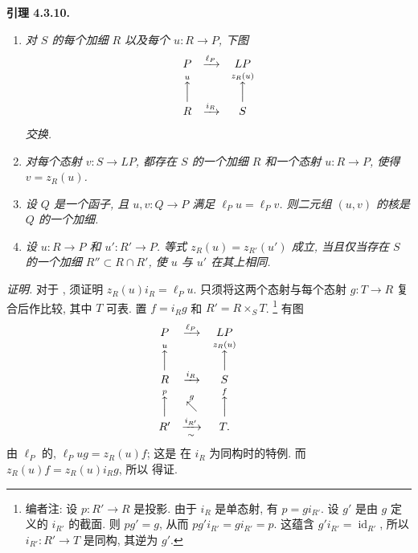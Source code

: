 \medskip
\noindent{}\textbf{引理 4.3.10.}
\begin{enumerate}
 \item[(i)] \textit{对 \(S\) 的每个加细
 \(R\) 以及每个 \(u:R\to P\), 下图}
 \[
 \begin{array}{ccc}
 P&\xrightarrow{\ell_P}&LP\\
 \overset{u}{\Big\uparrow}&&
 \overset{z_R(u)}{\Big\uparrow}\\
 R&\xrightarrow{i_R}&S
 \end{array}
 \]
 \textit{交换.}
 \item[(ii)] \textit{对每个态射
 \(v:S\to LP\), 都存在 \(S\) 的一个加细 \(R\) 和一个态射
 \(u:R\to P\), 使得 \(v=z_R(u)\).}
 \item[(iii)] \textit{设 \(Q\)
 是一个函子, 且 \(u,v:Q\to P\) 满足 \(\ell_Pu=\ell_Pv\).
 则二元组 \((u,v)\) 的核是 \(Q\) 的一个加细.}
 \item[(iv)] \textit{设
 \(u:R\to P\) 和 \(u':R'\to P\).
 等式 \(z_R(u)=z_{R'}(u')\) 成立, 当且仅当存在 \(S\) 的一个加细
 \(R''\subset R\cap R'\), 使 \(u\) 与 \(u'\) 在其上相同.}
\end{enumerate}

\noindent\textit{证明.}
对于 , 须证明
\(z_R(u)i_R=\ell_Pu\).
只须将这两个态射与每个态射 \(g:T\to R\) 复合后作比较, 其中 \(T\) 可表.
置 \(f=i_Rg\) 和 \(R'=R\times_ST\).
\footnote{编者注: 设 \(p:R'\to R\) 是投影.
由于 \(i_R\) 是单态射, 有 \(p=gi_{R'}\).
设 \(g'\) 是由 \(g\) 定义的 \(i_{R'}\) 的截面.
则 \(pg'=g\), 从而 \(pg'i_{R'}=gi_{R'}=p\).
这蕴含 \(g'i_{R'}=\operatorname{id}_{R'}\),
所以 \(i_{R'}:R'\to T\) 是同构, 其逆为 \(g'\).}
有图
\[
\begin{array}{ccccc}
 P&\xrightarrow{\ell_P}&LP&&\\
 \overset{u}{\Big\uparrow}&&
 \overset{z_R(u)}{\Big\uparrow}&&\\
 R&\xrightarrow{i_R}&S&&\\
 \overset{p}{\Big\uparrow}&\overset{g}{\nwarrow}&
 \overset{f}{\Big\uparrow}&&\\
 R'&\xrightarrow[\sim]{i_{R'}}&T.&&
\end{array}
\]
由 \(\ell_P\) 的,
\(\ell_Pug=z_R(u)f\); 这是
在 \(i_R\) 为同构时的特例.
而 \(z_R(u)f=z_R(u)i_Rg\), 所以
 得证.

